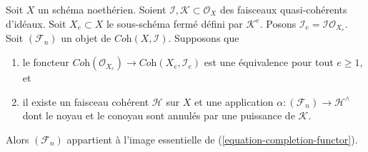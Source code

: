 \begin{lemma}
\label{lemma-existence-tricky}
Soit $X$ un schéma noethérien. Soient
$\mathcal{I}, \mathcal{K} \subset \mathcal{O}_X$
des faisceaux quasi-cohérents d'idéaux.
Soit $X_e \subset X$ le sous-schéma fermé défini par $\mathcal{K}^e$.
Posons $\mathcal{I}_e = \mathcal{I}\mathcal{O}_{X_e}$.
Soit $(\mathcal{F}_n)$ un objet de $\textit{Coh}(X, \mathcal{I})$.
Supposons que
\begin{enumerate}
\item le foncteur
$\textit{Coh}(\mathcal{O}_{X_e}) \to \textit{Coh}(X_e, \mathcal{I}_e)$
est une équivalence pour tout $e \geq 1$, et
\item il existe un faisceau cohérent $\mathcal{H}$ sur $X$ et une application
$\alpha : (\mathcal{F}_n) \to \mathcal{H}^\wedge$ dont le noyau et le
conoyau sont annulés par une puissance de $\mathcal{K}$.
\end{enumerate}
Alors $(\mathcal{F}_n)$ appartient à l'image essentielle de
(\ref{equation-completion-functor}).
\end{lemma}

